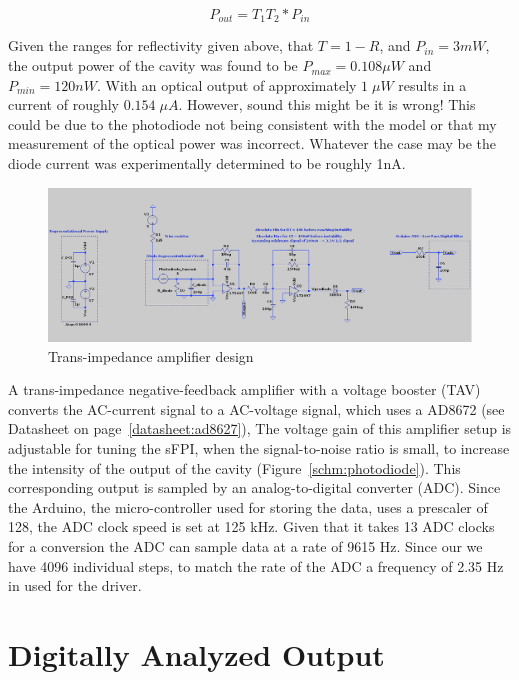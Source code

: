 \documentclass[12pt,journal]{IEEEtran}
\begin{document}
\begin{equation}
P_{out} = T_1T_2*P_{in}
\end{equation}

Given the ranges for reflectivity given above, that $T = 1-R$, and $P_{in} = 3 mW$, the output power of the cavity was found to be $P_{max} = 0.108 \mu W$ and $P_{min} = 120 nW$. With an optical output of approximately $1\;\mu W$ results in a current of roughly $0.154\;\mu A$. However, sound this might be it is wrong! This could be due to the photodiode not being consistent with the model or that my measurement of the optical power was incorrect. Whatever the case may be the diode current was experimentally determined to be roughly 1nA. 

\begin{figure}
	\centering
	\includegraphics[width=\textwidth]{./transimpedance_amp_design.png}
	\caption{Trans-impedance amplifier design}
	\label{fig{transimpedance-amp}}
\end{figure}

A trans-impedance negative-feedback amplifier with a voltage booster (TAV) converts the AC-current signal to a AC-voltage signal, which uses a AD8672 (see Datasheet on page~\ref{datasheet:ad8627}), The voltage gain of this amplifier setup is adjustable for tuning the sFPI, when the signal-to-noise ratio is small, to increase the intensity of the output of the cavity (Figure~\ref{schm:photodiode}). This corresponding output is sampled by an analog-to-digital converter (ADC). Since the Arduino, the micro-controller used for storing the data, uses a prescaler of 128, the ADC clock speed is set at 125 kHz. Given that it takes 13 ADC clocks for a conversion the ADC can sample data at a rate of 9615 Hz. Since our we have 4096 individual steps, to match the rate of the ADC a frequency of 2.35 Hz in used for the driver.    


\section{Digitally Analyzed Output}\label{digital-output}
\end{document}
